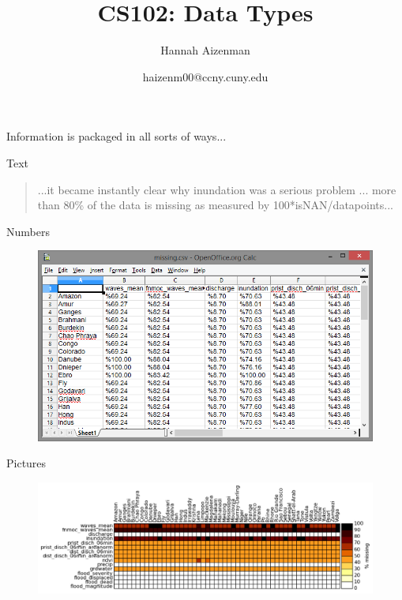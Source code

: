 \documentclass[xcolor={dvipsnames}]{beamer}
\begin{document}
\title{ CS102: Data Types}
\author{Hannah Aizenman}
\date{haizenm00@ccny.cuny.edu}


\begin{frame}
	\titlepage
\end{frame}

\begin{frame}
	\begin{center}
		Information is packaged in all sorts of ways...
	\end{center}
\end{frame}

\begin{frame}{Text}
	\begin{quote}
	 ...it became instantly clear why inundation was a serious problem ... more than 80\% of the data is missing as measured by 100*isNAN/datapoints...
	\end{quote}
\end{frame}

\begin{frame}{Numbers}
	\begin{figure}
			\includegraphics[width=1\textwidth]{numbers}
	\end{figure}
\end{frame}

\begin{frame}{Pictures}
	\begin{figure}
		\includegraphics[width=1\textwidth]{missing}
	\end{figure}
\end{frame}
\end{document}
